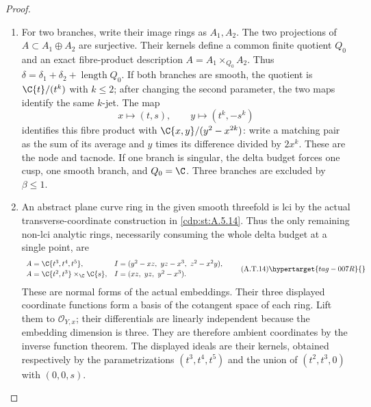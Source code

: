 \begin{proof}
\begin{enumerate}[label={$\langle1\rangle$\arabic*.},leftmargin=*]
\item For two branches, write their image rings as $A_1,A_2$.
The two projections of $A\subset A_1\oplus A_2$ are
surjective. Their kernels define a common finite
quotient $Q_0$ and an exact fibre-product description
$A=A_1\times_{Q_0}A_2$. Thus
$\delta=\delta_1+\delta_2+\operatorname{length}Q_0$.
If both branches are smooth, the quotient is
$\C\{t\}/(t^k)$ with $k\le2$; after changing the
second parameter, the two maps identify the same
$k$-jet. The map
\[
 x\longmapsto(t,s),\qquad
 y\longmapsto(t^k,-s^k)
\]
identifies this fibre product with
$\C\{x,y\}/(y^2-x^{2k})$: write a matching pair as
the sum of its average and $y$ times its difference
divided by $2x^k$. These are the node and tacnode.
If one branch is singular, the delta budget forces
one cusp, one smooth branch, and $Q_0=\C$.
Three branches are excluded by $\beta\le1$.

\item An abstract plane curve ring in the given smooth
threefold is lci by the actual transverse-coordinate
construction in \ref{cdp:st:A.5.14}. Thus the only remaining
non-lci analytic rings, necessarily consuming the
whole delta budget at a single point, are
\[
\begin{array}{ll}
 A=\C\{t^3,t^4,t^5\},
 &I=(y^2-xz,\ yz-x^3,\ z^2-x^2y),\\[2pt]
 A=\C\{t^2,t^3\}\times_{\C}\C\{s\},
 &I=(xz,\ yz,\ y^2-x^3).
\end{array}                                             \tag{A.T.14}\hypertarget{tag-007R}{}\label{cdp:eq:A.T.14}
\]
These are normal forms of the actual embeddings.
Their three displayed coordinate functions form a
basis of the cotangent space of each ring. Lift them
to $\mathcal O_{Y,x}$; their differentials are linearly
independent because the embedding dimension is three.
They are therefore ambient coordinates by the inverse
function theorem. The displayed ideals are their
kernels, obtained respectively by the parametrizations
$(t^3,t^4,t^5)$ and the union of $(t^2,t^3,0)$ with
$(0,0,s)$.


\end{enumerate}
\end{proof}
